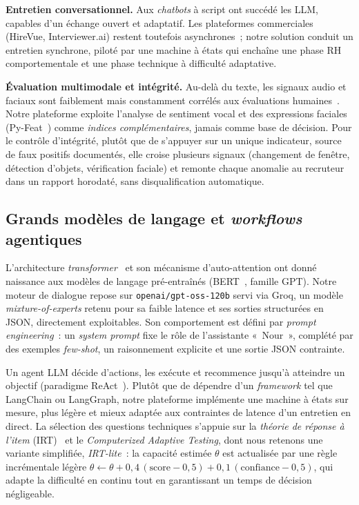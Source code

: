 \noindent\textbf{Entretien conversationnel.} Aux \textit{chatbots} à script ont succédé les LLM, capables d'un échange ouvert et adaptatif. Les plateformes commerciales (HireVue, Interviewer.ai) restent toutefois asynchrones~; notre solution conduit un entretien synchrone, piloté par une machine à états qui enchaîne une phase RH comportementale et une phase technique à difficulté adaptative.

\noindent\textbf{Évaluation multimodale et intégrité.} Au-delà du texte, les signaux audio et faciaux sont faiblement mais constamment corrélés aux évaluations humaines~\cite{ringeval2019}. Notre plateforme exploite l'analyse de sentiment vocal et des expressions faciales (Py-Feat~\cite{jolly2022}) comme \textit{indices complémentaires}, jamais comme base de décision. Pour le contrôle d'intégrité, plutôt que de s'appuyer sur un unique indicateur, source de faux positifs documentés, elle croise plusieurs signaux (changement de fenêtre, détection d'objets, vérification faciale) et remonte chaque anomalie au recruteur dans un rapport horodaté, sans disqualification automatique.

\subsection{Grands modèles de langage et \textit{workflows} agentiques}

L'architecture \textit{transformer}~\cite{vaswani2017} et son mécanisme d'auto-attention ont donné naissance aux modèles de langage pré-entraînés (BERT~\cite{devlin2019}, famille GPT). Notre moteur de dialogue repose sur \texttt{openai/gpt-oss-120b} servi via Groq, un modèle \textit{mixture-of-experts} retenu pour sa faible latence et ses sorties structurées en JSON, directement exploitables. Son comportement est défini par \textit{prompt engineering}~: un \textit{system prompt} fixe le rôle de l'assistante «~Nour~», complété par des exemples \textit{few-shot}, un raisonnement explicite et une sortie JSON contrainte.

Un agent LLM décide d'actions, les exécute et recommence jusqu'à atteindre un objectif (paradigme ReAct~\cite{yao2023}). Plutôt que de dépendre d'un \textit{framework} tel que LangChain ou LangGraph, notre plateforme implémente une machine à états sur mesure, plus légère et mieux adaptée aux contraintes de latence d'un entretien en direct. La sélection des questions techniques s'appuie sur la \textit{théorie de réponse à l'item} (IRT)~\cite{lord1980} et le \textit{Computerized Adaptive Testing}, dont nous retenons une variante simplifiée, \textit{IRT-lite}~: la capacité estimée $\theta$ est actualisée par une règle incrémentale légère $\theta \leftarrow \theta + 0{,}4\,(\text{score}-0{,}5) + 0{,}1\,(\text{confiance}-0{,}5)$, qui adapte la difficulté en continu tout en garantissant un temps de décision négligeable.

